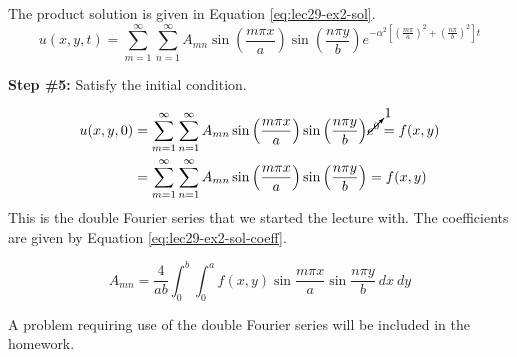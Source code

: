 \noindent The product solution is given in Equation \ref{eq:lec29-ex2-sol}.
\begin{equation}
u(x,y,t) = \sum\limits_{m=1}^{\infty} \sum\limits_{n=1}^{\infty} A_{mn} \sin{\left(\frac{m \pi x}{a}\right)} \sin{\left(\frac{n \pi y}{b}\right)}e^{-\alpha^2\left[\left(\frac{m \pi}{a}\right)^2 + \left(\frac{n \pi}{b} \right)^2 \right]t}
\label{eq:lec29-ex2-sol}
\end{equation}

\vspace{0.25cm}

\noindent\textbf{Step \#5:} Satisfy the initial condition.

\begin{align*}
u(x,y,0) &= \sum\limits_{m=1}^{\infty} \sum\limits_{n=1}^{\infty} A_{mn} \sin{\left(\frac{m \pi x}{a}\right)} \sin{\left(\frac{n \pi y}{b}\right)} \cancelto{1}{e^{0}} = f(x,y) \\
&=\sum\limits_{m=1}^{\infty} \sum\limits_{n=1}^{\infty} A_{mn} \sin{\left(\frac{m \pi x}{a}\right)} \sin{\left(\frac{n \pi y}{b}\right)} = f(x,y)
\end{align*}
This is the double Fourier series that we started the lecture with.  The coefficients are given by Equation \ref{eq:lec29-ex2-sol-coeff}.

\begin{equation}
A_{mn} = \frac{4}{a b} \int_0^b \int_0^a f(x,y) \sin{\frac{m \pi x}{a}} \sin{\frac{n \pi y}{b}} \ dx \ dy
\label{eq:lec29-ex2-sol-coeff}
\end{equation}

\vspace{0.1cm}

\noindent A problem requiring use of the double Fourier series will be included in the homework.

